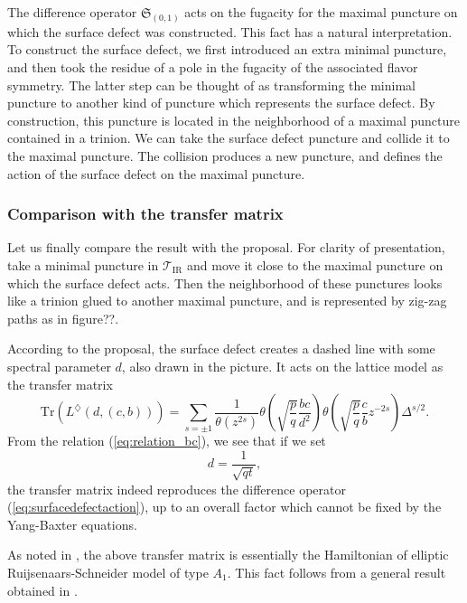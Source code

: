 The difference operator $\mathfrak{S}_{(0,1)}$ acts on the fugacity
for the maximal puncture on which the surface defect was constructed.
This fact has a natural interpretation. To construct the surface defect,
we first introduced an extra minimal puncture, and then took the residue
of a pole in the fugacity of the associated flavor symmetry. The latter
step can be thought of as transforming the minimal puncture to another
kind of puncture which represents the surface defect. By construction,
this puncture is located in the neighborhood of a maximal puncture
contained in a trinion. We can take the surface defect puncture and
collide it to the maximal puncture. The collision produces a new puncture,
and defines the action of the surface defect on the maximal puncture.





\subsubsection{Comparison with the transfer matrix}

Let us finally compare the result with the proposal. For clarity of
presentation, take a minimal puncture in $\mathcal{T}_{\mathrm{IR}}$
and move it close to the maximal puncture on which the surface defect
acts. Then the neighborhood of these punctures looks like a trinion
glued to another maximal puncture, and is represented by zig-zag paths
as in figure??.

According to the proposal, the surface defect creates a dashed line
with some spectral parameter $d$, also drawn in the picture. It acts
on the lattice model as the transfer matrix
\begin{equation}
    \mathrm{Tr}\left(L^{\diamondsuit}\left(d,(c,b)\right)\right)  
      =  
        \sum_{s=\pm1}\frac{1}{\theta(z^{2s})}
        \theta\left(\sqrt{\frac{p}{q}}\frac{bc}{d^{2}}\right)
        \theta\left(\sqrt{\frac{p}{q}}\frac{c}{b}z^{-2s}\right)
        \Delta^{s/2}.
\end{equation}
 From the relation (\ref{eq:relation_bc}), we see that if we set
\begin{equation}
    d  =  \frac{1}{\sqrt{qt}},
\end{equation}
 the transfer matrix indeed reproduces the difference operator (\ref{eq:surfacedefectaction}),
up to an overall factor which cannot be fixed by the Yang-Baxter equations.

As noted in \cite{Gaiotto:2012xa}, the above transfer matrix
is essentially the Hamiltonian of elliptic Ruijsenaars-Schneider model
\cite{MR851627,Ruijsenaars:1986pp} of type $A_{1}$. This fact
follows from a general result obtained in \cite{MR1463830}. 

